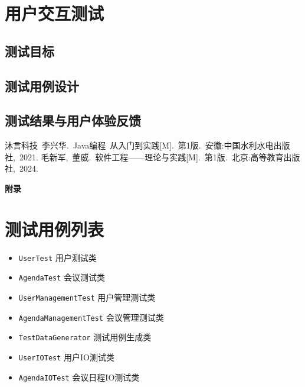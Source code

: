 \documentclass[a4paper, twoside, utf8]{ctexart}
\begin{document}

    \section{用户交互测试}

    \subsection{测试目标}

    

    \subsection{测试用例设计}

    

    \subsection{测试结果与用户体验反馈}

    
	
    \begin{thebibliography}{99}
         沐言科技\ 李兴华.\ Java编程\ 从入门到实践[M].\ 第1版.\ 安徽:中国水利水电出版社,\ 2021.
         毛新军,\ 董威.\ 软件工程——理论与实践[M].\ 第1版.\ 北京:高等教育出版社,\ 2024.
    \end{thebibliography}
	
	\newpage
	\appendix
	\centerline{\Large{\textbf{附录}}}

    \section{测试用例列表}

    \begin{itemize}[itemsep=2pt, topsep=0pt, parsep=0pt]
        \item \verb|UserTest| \quad 用户测试类
        \item \verb|AgendaTest| \quad 会议测试类
        \item \verb|UserManagementTest| \quad 用户管理测试类
        \item \verb|AgendaManagementTest| \quad 会议管理测试类
        \item \verb|TestDataGenerator| \quad 测试用例生成类
        \item \verb|UserIOTest| \quad 用户IO测试类
        \item \verb|AgendaIOTest| \quad 会议日程IO测试类
    \end{itemize}
\end{document}
